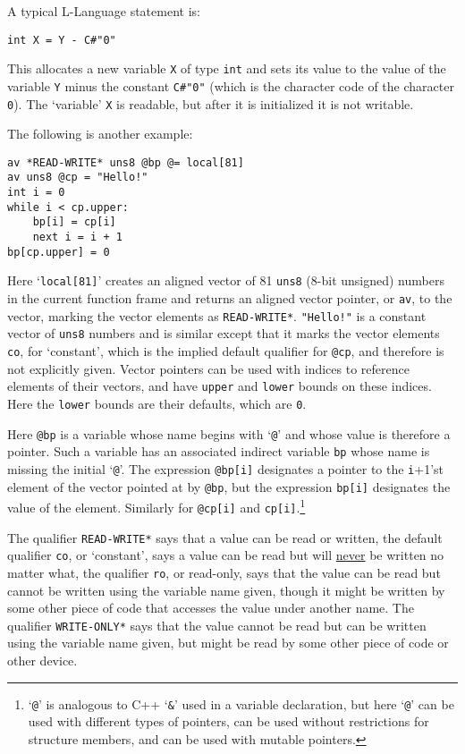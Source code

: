 \documentclass[12pt]{article}
\newenvironment{indpar}[1][0.3in]%
	{\begin{list}{}%
		     {\setlength{\itemsep}{0in}%
		      \setlength{\topsep}{0in}%
		      \setlength{\parsep}{1ex}%
		      \setlength{\labelwidth}{#1}%
		      \setlength{\leftmargin}{#1}%
		      \addtolength{\leftmargin}{\labelsep}}%
	 \item}%
	{\end{list}}
\begin{document}
A typical L-Language statement is:
\begin{indpar}\begin{verbatim}
int X = Y - C#"0"
\end{verbatim}\end{indpar}
This allocates a new variable {\tt X} of type {\tt int}
and sets its value to the value of the
variable {\tt Y} minus the constant {\tt C\#"0"} (which is
the character code of the character {\tt 0}).
The `variable' {\tt X} is readable, but after it is
initialized it is not writable.

The following is another example:
\begin{indpar}\begin{verbatim}
av *READ-WRITE* uns8 @bp @= local[81]
av uns8 @cp = "Hello!"
int i = 0
while i < cp.upper:
    bp[i] = cp[i]
    next i = i + 1
bp[cp.upper] = 0
\end{verbatim}\end{indpar}

Here `{\tt local[81]}' creates an aligned vector of
81 {\tt uns8} (8-bit unsigned) numbers in the current function
frame and returns an aligned vector pointer, or {\tt av}, to
the vector, marking the vector elements as {\tt *READ-WRITE*}.
{\tt "Hello!"} is a constant vector of {\tt uns8} numbers
and is similar except that it marks the vector elements
{\tt co}, for `constant', which is the implied default qualifier
for {\tt @cp}, and therefore
is not explicitly given.
Vector pointers can be used with indices
to reference elements of their vectors, and have {\tt upper} and
{\tt lower} bounds on these indices.  Here the {\tt lower} bounds
are their defaults, which are {\tt 0}.

Here {\tt @bp} is a variable whose name begins with `{\tt @}' and
whose value is therefore a pointer.  Such a variable has an associated
indirect variable {\tt bp} whose name is missing the initial `{\tt @}'.
The expression {\tt @bp[i]} designates a pointer to the {\tt i}+1'st
element of the vector pointed at by {\tt @bp}, but the expression
{\tt bp[i]} designates the value of the element.  Similarly for
{\tt @cp[i]} and {\tt cp[i]}.\footnote{`{\tt @}' is analogous to
C++ `{\tt \&}' used in a variable declaration, but here `{\tt @}'
can be used with different types of pointers, can be used
without restrictions for structure members, and can be used
with mutable pointers.}

The qualifier {\tt *READ-WRITE*} says that a value can be read or written,
the default qualifier {\tt co}, or `constant',
says a value can be read but will \underline{never} be written no matter what,
the qualifier {\tt ro}, or read-only, says that
the value can be read but
cannot be written using the variable name given, though it might be
written by some other piece of code that accesses the value under another
name.  The qualifier {\tt *WRITE-ONLY*} says that the value cannot be
read but can be written using the variable name given,
but might be read by some other piece of code or other device.
\end{document}
